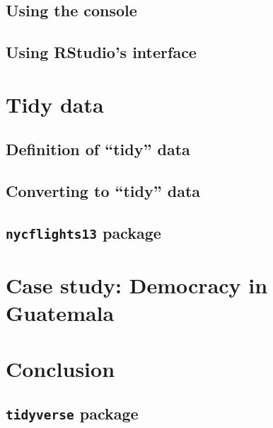 \documentclass[
  12pt, krantz2,
]{krantz}
\begin{document}
\hypertarget{using-the-console}{%
\subsection{Using the console}\label{using-the-console}}

\hypertarget{using-rstudios-interface}{%
\subsection{Using RStudio's interface}\label{using-rstudios-interface}}

\hypertarget{tidy-data-ex}{%
\section{Tidy data}\label{tidy-data-ex}}

\hypertarget{definition-of-tidy-data}{%
\subsection{Definition of ``tidy'' data}\label{definition-of-tidy-data}}

\hypertarget{converting-to-tidy-data}{%
\subsection{Converting to ``tidy'' data}\label{converting-to-tidy-data}}

\hypertarget{nycflights13-package-1}{%
\subsection{\texorpdfstring{\texttt{nycflights13} package}{nycflights13 package}}\label{nycflights13-package-1}}

\hypertarget{case-study-tidy}{%
\section{Case study: Democracy in Guatemala}\label{case-study-tidy}}

\hypertarget{conclusion-3}{%
\section{Conclusion}\label{conclusion-3}}

\hypertarget{tidyverse-package}{%
\subsection{\texorpdfstring{\texttt{tidyverse} package}{tidyverse package}}\label{tidyverse-package}}
\end{document}
